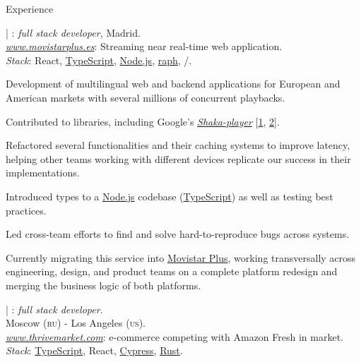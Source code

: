 \documentclass[11pt,a4paper]{article}
\newcommand{\plus}{\raisebox{.4\height}{\scalebox{.6}{+}}} %
\begin{document}
\begin{cv}
  \begin{cvlist}{Experience}
    \item[2023--] {\href{https://www.telefonica.es/es/}{}} {\big|} \href{https://full-on-net.com}{}: {\it{full stack developer}}, Madrid.\\
    {\href{https://movistarplus.es}{\textit{www.movistarplus.es}}}: Streaming near real-time web application.\\
    \textit{Stack}: React, \href{https://www.typescriptlang.org}{TypeScript}, \href{https://nodejs.org/en/}{Node.js}, {\href{https://graphql.org/}{{}raph{}}}, {}/{}.\
    \begin{customlist}[topsep={-4pt},partopsep={0pt}, noitemsep]
      \item Development of multilingual web and backend \href{https://bff-patterns.com/}{} \mbox{applications} for European and American markets with several millions of concurrent playbacks.
      \item Contributed to libraries, including Google's  \href{https://github.com/shaka-project/shaka-player}{\textit{Shaka-player}} [\href{https://github.com/shaka-project/shaka-player/pull/9943}{1}, \href{https://github.com/shaka-project/shaka-player/pull/6022}{2}].
      \item Refactored several functionalities and their caching systems to improve latency, helping other teams working with different devices replicate our success in their implementations.
      \item Introduced types to a \href{https://nodejs.org/en/}{Node.js} codebase (\href{https://www.typescriptlang.org}{TypeScript}) as well as testing best practices.
      \item Led cross-team efforts to find and solve hard-to-reproduce bugs across systems.
      \item Currently migrating this service into \href{https://movistarplus.es}{Movistar Plus{\plus}}, working transversally across engineering, design, and product teams on a complete platform redesign and merging the business logic of both platforms.
    \end{customlist}

    \item[2019--2022] {\href{https://thrivemarket.com/}{}}  {\big|} \href{https://distillery.com}{}: {\it{full stack developer}}.\\{Moscow (\textsc{ru})} - Los Angeles (\textsc{us}).\\
    \href{https://thrivemarket.com}{\textit{www.thrivemarket.com}}: e-commerce competing with Amazon Fresh in {\sc{us}} market.\\
    \textit{Stack}: \href{https://www.typescriptlang.org}{TypeScript}, React, \href{https://www.cypress.io/}{Cypress}, \href{https://www.rust-lang.org/}{Rust}.


\end{cvlist}
\end{cv}
\end{document}
